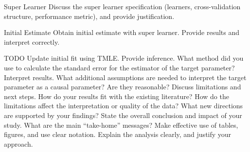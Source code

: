 \documentclass[11pt, xcolor={dvipsnames}, usepdftitle=false]{beamer}
\begin{document}
\begin{frame}
\end{frame}

\begin{frame}{Super Learner}
Discuss the super learner specification (learners, cross-validation structure, performance metric), and provide justification.
\end{frame}

\begin{frame}{Initial Estimate}
Obtain initial estimate with super learner. Provide results and interpret correctly.
\end{frame}

\begin{frame}{TODO}
Update initial fit using TMLE. 
Provide inference. What method did you use to calculate the standard error for the estimator of the target parameter?
Interpret results. What additional assumptions are needed to interpret the target parameter as a causal parameter? Are they reasonable?
Discuss limitations and next steps. How do your results fit with the existing literature?
How do the limitations affect the interpretation or quality of the data? What new directions are supported by your findings?
State the overall conclusion and impact of your study. What are the main “take-home” messages?
Make effective use of tables, figures, and use clear notation.
Explain the analysis clearly, and justify your approach.
\end{frame}
\end{document}
